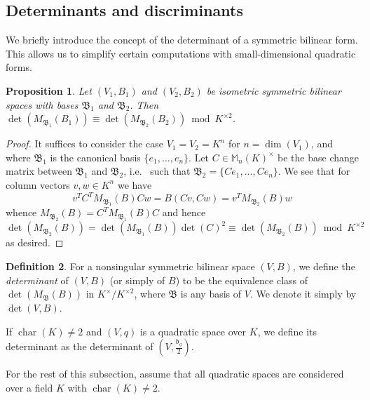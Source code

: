 \documentclass[12pt, leqno, british]{amsart}
\theoremstyle{definition}
\newtheorem{defi}{Definition}[subsection]
\theoremstyle{plain}
\newtheorem{prop}[defi]{Proposition}
\theoremstyle{remark}
\newcommand{\mf}{\mathfrak}
\newcommand{\mbb}{\mathbb}
\DeclareMathOperator{\charac}{char}
\begin{document}
\subsection{Determinants and discriminants}
We briefly introduce the concept of the determinant of a symmetric bilinear form.
This allows us to simplify certain computations with small-dimensional quadratic forms.
\begin{prop}
Let $(V_1, B_1)$ and $(V_2, B_2)$ be isometric symmetric bilinear spaces with bases $\mf{B}_1$ and $\mf{B}_2$.
Then $\det (M_\mf{B_1}(B_1)) \equiv \det (M_{\mf{B}_2}(B_2)) \bmod K^{\times 2}$.
\end{prop}
\begin{proof}
It suffices to consider the case $V_1 = V_2 = K^n$ for $n = \dim(V_1)$, and where $\mf{B}_1$ is the canonical basis $\lbrace e_1, \ldots, e_n \rbrace$.
Let $C \in \mbb{M}_n(K)^\times$ be the base change matrix between $\mf{B}_1$ and $\mf{B}_2$, i.e. ~such that $\mf{B}_2 = \lbrace Ce_1, \ldots, Ce_n \rbrace$.
We see that for column vectors $v, w \in K^n$ we have
\begin{displaymath}
v^T C^T M_{\mf{B}_{1}}(B) C w = B(Cv, Cw) = v^T M_{\mf{B}_2}(B) w
\end{displaymath}
whence $M_{\mf{B}_2}(B) = C^T M_{\mf{B}_{1}}(B) C$ and hence $\det(M_{\mf{B}_2}(B)) = \det(M_{\mf{B}_{1}}(B)) \det(C)^2 \equiv \det(M_{\mf{B}_2}(B)) \bmod K^{\times 2}$ as desired.
\end{proof}
\begin{defi}
For a nonsingular symmetric bilinear space $(V, B)$, we define the \emph{determinant} of $(V, B)$ (or simply of $B$) to be the equivalence class of $\det(M_{\mf{B}}(B))$ in $K^\times/K^{\times 2}$, where $\mf{B}$ is any basis of $V$.
We denote it simply by $\det(V, B)$.

If $\charac(K) \neq 2$ and $(V, q)$ is a quadratic space over $K$, we define its determinant as the determinant of $(V, \frac{\mf{b}_q}{2})$.
\end{defi}
For the rest of this subsection, assume that all quadratic spaces are considered over a field $K$ with $\charac(K) \neq 2$.
\end{document}
